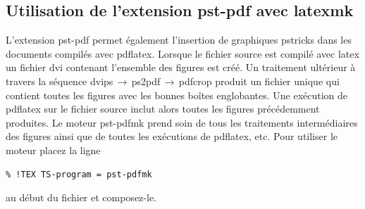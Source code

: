 \documentclass[11pt,french]{article}
\newcommand{\latexmk}{\textsf{latexmk}}
\newcommand{\cmd}[1]{\textsf{#1}}
\newcommand{\To}{\,\(\to\)\,}
\begin{document}
%


\subsection{Utilisation de l'extension \cmd{pst-pdf} avec \latexmk}

L'extension \cmd{pst-pdf} permet également l'insertion de graphiques \cmd{pstricks} dans les documents compilés avec \cmd{pdflatex}. Lorsque le fichier source est compilé avec \cmd{latex} un fichier \cmd{dvi} contenant l'ensemble des figures est créé. Un traitement ultérieur à travers la séquence \cmd{dvips}\To\cmd{ps2pdf}\To\cmd{pdfcrop} produit un fichier unique qui contient toutes les figures avec les bonnes boîtes englobantes. Une exécution de \cmd{pdflatex} sur le fichier source inclut alors toutes les figures précédemment produites. Le moteur \cmd{pst-pdfmk} prend soin de tous les traitements intermédiaires des figures ainsi que de toutes les exécutions de \cmd{pdflatex}, etc. Pour utiliser le moteur placez la ligne
\begin{verbatim}
% !TEX TS-program = pst-pdfmk
\end{verbatim}
au début du fichier et composez-le. 
\end{document}
